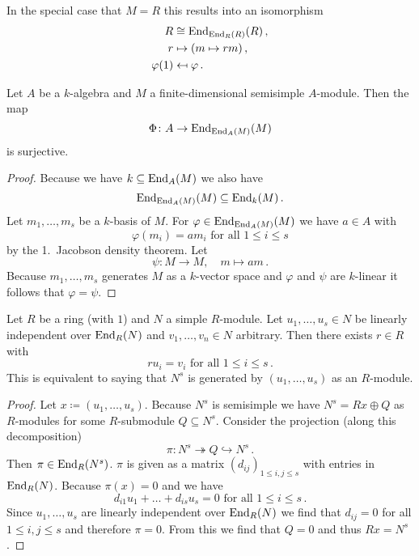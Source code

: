 \begin{remark}
  In the special case that $M = R$ this results into an isomorphism
  \begin{align*}
                R
    &\cong      \operatorname{End}_{\operatorname{End}_R(R)}(R) \,, \\
                r
    &\mapsto    (m \mapsto rm) \,,  \\
                \varphi(1)
    &\mapsfrom  \varphi \,.
  \end{align*}
\end{remark}


\begin{corollary}
  Let $A$ be a $k$-algebra and $M$ a finite-dimensional semisimple $A$-module.
  Then the map
  \[
            \Phi
    \colon  A
    \to     \operatorname{End}_{\operatorname{End}_A(M)}(M)
  \]
  is surjective.
\end{corollary}
\begin{proof}
  Because we have $k \subseteq \operatorname{End}_A(M)$ we also have
  \[
              \operatorname{End}_{\operatorname{End}_A(M)}(M)
    \subseteq \operatorname{End}_k(M) \,.
  \]
  Let $m_1, \dotsc, m_s$ be a $k$-basis of $M$.
  For $\varphi \in \operatorname{End}_{\operatorname{End}_A(M)}(M)$ we have $a \in A$ with
  \[
      \varphi(m_i)
    = a m_i
    \text{ for all }
    1 \leq i \leq s
  \]
  by the 1.\ Jacobson density theorem.
  Let
  \[
            \psi
    \colon  M \to M,
    \quad   m
    \mapsto am \,.
  \]
  Because $m_1, \dotsc, m_s$ generates $M$ as a $k$-vector space and $\varphi$ and $\psi$ are $k$-linear it follows that $\varphi = \psi$.
\end{proof}


\begin{theorem}
  Let $R$ be a ring (with $1$) and $N$ a simple $R$-module.
  Let $u_1, \dotsc, u_s \in N$ be linearly independent over $\operatorname{End}_R(N)$ and $v_1, \dotsc, v_n \in N$ arbitrary.
  Then there exists $r \in R$ with
  \[
      r u_i
    = v_i
    \text{ for all }
    1 \leq i \leq s \,.
  \]
  This is equivalent to saying that $N^s$ is generated by $(u_1, \dotsc, u_s)$ as an $R$-module.
\end{theorem}


\begin{proof}
  Let $x \coloneqq (u_1, \dotsc, u_s)$.
  Because $N^s$ is semisimple we have $N^s = Rx \oplus Q$ as $R$-modules for some $R$-submodule $Q \subseteq N^s$.
  Consider the projection (along this decomposition)
  \[
                        \pi
    \colon              N^s
    \twoheadrightarrow  Q
    \hookrightarrow     N^s \,.
  \]
  Then $\pi \in \operatorname{End}_R(N^s)$.
  $\pi$ is given as a matrix $(d_{ij})_{1 \leq i,j \leq s}$ with entries in $\operatorname{End}_R(N)$.
  Because $\pi(x) = 0$ and we have
  \[
      d_{i1} u_1 + \dotsc + d_{is} u_s
    = 0
    \text{ for all }
    1 \leq i \leq s \,.
  \]
  Since $u_1, \dotsc, u_s$ are linearly independent over $\operatorname{End}_R(N)$ we find that $d_{ij} = 0$ for all $1 \leq i,j \leq s$ and therefore $\pi = 0$.
  From this we find that $Q = 0$ and thus $Rx = N^s$.
\end{proof}


